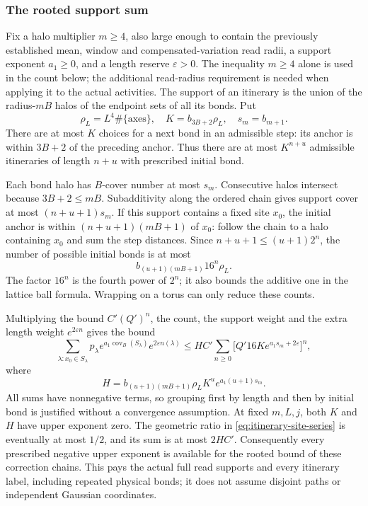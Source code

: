 \subsubsection{The rooted support sum}
Fix a halo multiplier $m\ge4$, also large enough to contain the
previously established mean, window and compensated-variation read
radii, a support exponent $a_1\ge0$, and a length reserve
$\varepsilon>0$. The inequality $m\ge4$ alone is used in the
count below; the additional read-radius requirement is needed
when applying it to the actual activities. The support of an itinerary
is the union of the radius-$mB$ halos of the endpoint sets of
all its bonds. Put
\[
 \rho_L=L^4\#\{\mathrm{axes}\},\quad
 K=b_{3B+2}\rho_L,\quad s_m=b_{m+1}.
\]
There are at most $K$ choices for a next bond in an admissible
step: its anchor is within $3B+2$ of the preceding anchor.
Thus there are at most $K^{n+u}$ admissible itineraries of length
$n+u$ with prescribed initial bond.

Each bond halo has $B$-cover number at most $s_m$. Consecutive
halos intersect because $3B+2\le mB$. Subadditivity along the
ordered chain gives support cover at most $(n+u+1)s_m$.
If this support contains a fixed site $x_0$, the initial anchor
is within $(n+u+1)(mB+1)$ of $x_0$: follow the chain to a halo
containing $x_0$ and sum the step distances. Since
$n+u+1\le(u+1)2^n$, the number of possible initial bonds is at
most
\[
 b_{(u+1)(mB+1)}16^n\rho_L.
\]
The factor $16^n$ is the fourth power of $2^n$; it also bounds
the additive one in the lattice ball formula. Wrapping on a torus
can only reduce these counts.

Multiplying the bound $C'(Q')^n$, the count, the support weight
and the extra length weight $e^{2\varepsilon n}$ gives the bound
\begin{equation}\label{eq:itinerary-site-series}
 \sum_{\lambda:x_0\in S_\lambda}
 p_\lambda e^{a_1\operatorname{cov}_B(S_\lambda)}
                   e^{2\varepsilon n(\lambda)}
 \le H C'\sum_{n\ge0}
 \bigl[Q'16K e^{a_1s_m+2\varepsilon}\bigr]^n,
\end{equation}
where
\[
 H=b_{(u+1)(mB+1)}\rho_L K^u e^{a_1(u+1)s_m}.
\]
All sums have nonnegative terms, so grouping first by length and
then by initial bond is justified without a convergence assumption.
At fixed $m,L,j$, both $K$ and $H$ have upper exponent zero.
The geometric ratio in \eqref{eq:itinerary-site-series} is
eventually at most $1/2$, and its sum is at most $2HC'$.
Consequently every prescribed negative upper exponent is available
for the rooted bound of these correction chains. This pays the
actual full read supports and every itinerary label, including
repeated physical bonds; it does not assume disjoint paths or
independent Gaussian coordinates.
